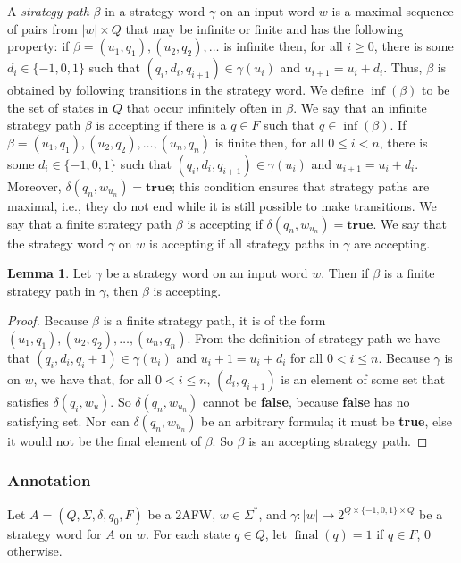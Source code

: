 \documentclass[10pt,a4paper]{amsart}
\theoremstyle{plain}
\theoremstyle{definition}
\newtheorem{lemma}[thm]{Lemma}
\theoremstyle{definition}
\DeclareMathOperator{\?}{?}
\DeclareMathOperator{\final}{final}
\begin{document}
A \textit{strategy path} $\beta$ in a strategy word $\gamma$ on an input word $w$ is a maximal sequence of pairs
from $|w| \times Q$ that may be infinite
or finite and has the following property: if $\beta = (u_1,q_1), (u_2,q_2),\ldots$ is infinite then, for all $i \geq 0$,
there is some $d_i \in \{-1,0,1\}$ such that $(q_i,d_i,q_{i+1}) \in \gamma(u_i)$ and $u_{i+1} = u_i + d_i$.
Thus, $\beta$ is obtained by following transitions in the strategy word. We define
$\inf(\beta)$ to be the set of states in $Q$ that occur infinitely often in $\beta$. We say that an infinite strategy path $\beta$ is
accepting if there is a $q \in F$ such that $q \in \inf(\beta)$.
If $\beta = (u_1,q_1),(u_2,q_2),\ldots,(u_n,q_n)$ is finite then, for all $0 \leq i < n$, there is
some $d_i \in \{-1,0,1\}$ such that $(q_i,d_i,q_{i+1}) \in \gamma(u_i)$ and $u_{i+1} = u_i + d_i$.
Moreover, $\delta(q_n,w_{u_n}) = \textbf{true}$; this condition ensures that strategy paths are maximal, i.e., they do not end while it is still possible
to make transitions. We say that a finite strategy path $\beta$
is accepting if $\delta(q_n,w_{u_n}) = \textbf{true}$. We say that the strategy word $\gamma$ on $w$ is accepting if all strategy paths in $\gamma$ are accepting.

\begin{lemma}
Let $\gamma$ be a strategy word on an input word $w$. Then if $\beta$ is a finite strategy path in $\gamma$, then $\beta$ is accepting.
\end{lemma}
\begin{proof}
Because $\beta$ is a finite strategy path, it is of the form $(u_1,q_1),(u_2,q_2),\ldots,(u_n,q_n)$. From the definition of strategy path we have that $(q_i,d_i,q_i+1) \in \gamma(u_i)$ and $u_i+1 = u_i + d_i$ for all $0 < i \leq n$. Because $\gamma$ is on $w$, we have that, for all $0 < i \leq n$, $(d_i,q_{i+1})$ is an element of some set that satisfies $\delta(q_i,w_u)$. So $\delta(q_n,w_{u_n})$ cannot be \textbf{false}, because \textbf{false} has no satisfying set. Nor can $\delta(q_n,w_{u_n})$ be an arbitrary formula; it must be \textbf{true}, else it would not be the final element of $\beta$. So $\beta$ is an accepting strategy path.
\end{proof}



\subsubsection{Annotation}
Let $A = (Q,\Sigma,\delta,q_0,F)$ be a 2AFW, $w \in \Sigma^*$, and $\gamma : |w| \rightarrow 2^{Q \times \{-1,0,1\} \times Q}$ be a
strategy word for $A$ on $w$. For each state $q \in Q$, let $\final(q) = 1$ if $q \in F$, $0$ otherwise.
\end{document}
